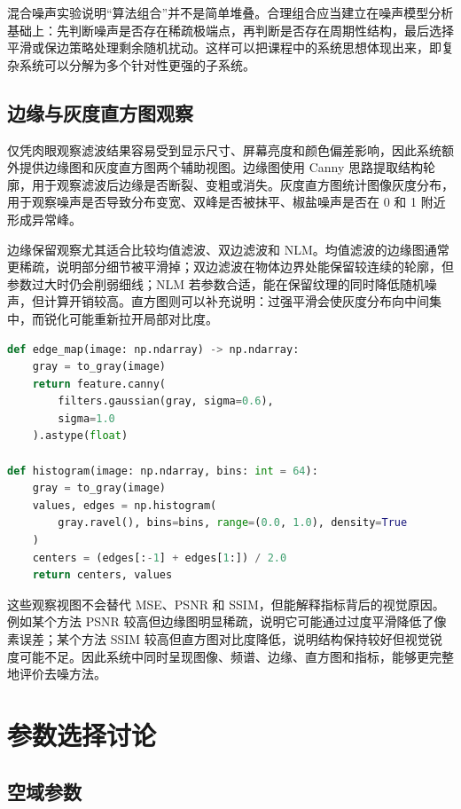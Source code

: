 \documentclass[UTF8,a4paper,12pt]{ctexart}
\begin{document}
混合噪声实验说明“算法组合”并不是简单堆叠。合理组合应当建立在噪声模型分析基础上：先判断噪声是否存在稀疏极端点，再判断是否存在周期性结构，最后选择平滑或保边策略处理剩余随机扰动。这样可以把课程中的系统思想体现出来，即复杂系统可以分解为多个针对性更强的子系统。

\subsection{边缘与灰度直方图观察}

仅凭肉眼观察滤波结果容易受到显示尺寸、屏幕亮度和颜色偏差影响，因此系统额外提供边缘图和灰度直方图两个辅助视图。边缘图使用 Canny 思路提取结构轮廓，用于观察滤波后边缘是否断裂、变粗或消失。灰度直方图统计图像灰度分布，用于观察噪声是否导致分布变宽、双峰是否被抹平、椒盐噪声是否在 0 和 1 附近形成异常峰。

边缘保留观察尤其适合比较均值滤波、双边滤波和 NLM。均值滤波的边缘图通常更稀疏，说明部分细节被平滑掉；双边滤波在物体边界处能保留较连续的轮廓，但参数过大时仍会削弱细线；NLM 若参数合适，能在保留纹理的同时降低随机噪声，但计算开销较高。直方图则可以补充说明：过强平滑会使灰度分布向中间集中，而锐化可能重新拉开局部对比度。

\begin{lstlisting}[language=Python,caption={边缘图和灰度直方图分析实现}]
def edge_map(image: np.ndarray) -> np.ndarray:
    gray = to_gray(image)
    return feature.canny(
        filters.gaussian(gray, sigma=0.6),
        sigma=1.0
    ).astype(float)

def histogram(image: np.ndarray, bins: int = 64):
    gray = to_gray(image)
    values, edges = np.histogram(
        gray.ravel(), bins=bins, range=(0.0, 1.0), density=True
    )
    centers = (edges[:-1] + edges[1:]) / 2.0
    return centers, values
\end{lstlisting}

这些观察视图不会替代 MSE、PSNR 和 SSIM，但能解释指标背后的视觉原因。例如某个方法 PSNR 较高但边缘图明显稀疏，说明它可能通过过度平滑降低了像素误差；某个方法 SSIM 较高但直方图对比度降低，说明结构保持较好但视觉锐度可能不足。因此系统中同时呈现图像、频谱、边缘、直方图和指标，能够更完整地评价去噪方法。

\section{参数选择讨论}

\subsection{空域参数}
\end{document}
